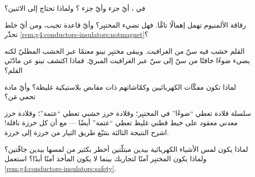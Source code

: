 \begin{exercise}[$\star$]\label{exo:g4:conductors-insulators:6}
في ، أيّ جزء  وأيّ جزء ؟ ولماذا تحتاج إلى
الاثنين؟
\end{exercise}

\begin{exercise}[$\star$]\label{exo:g4:conductors-insulators:7}
رقاقة الألمنيوم تهمل  إهمالًا تامًّا. فهل تضيء 
المختبِر؟ وأيّ قاعدة تجيب، ومن أيّ خلط تحذّر
\cref{rem:g4:conductors-insulators:notmagnet}؟
\end{exercise}

\begin{exercise}[$\star$]\label{exo:g4:conductors-insulators:8}
القلم خشب فيه سنّ من الغرافيت. ويبقى مختبِر نينو معتمًا عبر
الخشب المطليّ لكنه يضيء ضوءًا خافتًا من سنّ إلى سنّ عبر
الغرافيت المبريّ. فماذا اكتشف نينو عن مادّتَي القلم؟
\end{exercise}

\begin{exercise}[$\star$]\label{exo:g4:conductors-insulators:9}
لماذا تكون مفكّات الكهربائيين وكمّاشاتهم ذات مقابض بلاستيكية
غليظة؟ وأيّ مادة تحمي مَن؟
\end{exercise}

\begin{exercise}[$\star\star$]\label{exo:g4:conductors-insulators:10}
سلسلة قلادة تعطي ``ضوءًا'' في المختبِر؛ وقلادة خرز خشبي تعطي
``عتمة''؛ وقلادة خرز معدني معقود على خيط قطني غليظ تعطي
``عتمة'' أيضًا --- مع أن كل خرزة ناقلة! اشرح النتيجة الثالثة
بتتبّع طريق التيار من خرزة إلى خرزة.
\end{exercise}

\begin{exercise}[$\star\star$]\label{exo:g4:conductors-insulators:11}
لماذا يكون لمس الأشياء الكهربائية بيدين مبتلّتين أخطر بكثير من
لمسها بيدين جافّتين؟ ولماذا يكون المختبِر  آمنًا
لتجاربك بينما لا يكون المأخذ آمنًا أبدًا؟ استعمل
\cref{rem:g4:conductors-insulators:safety}.
\end{exercise}
